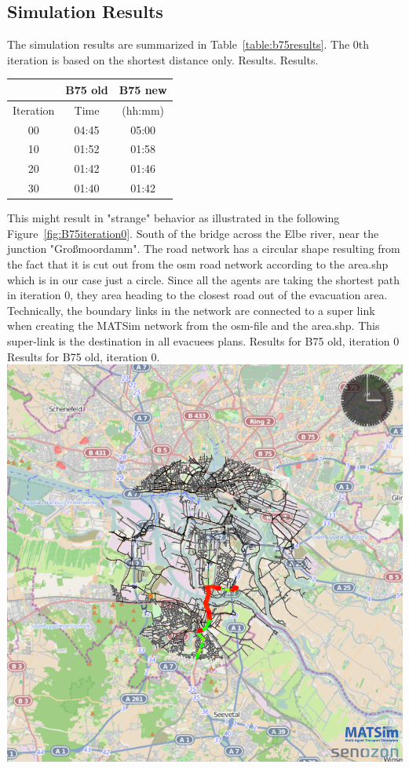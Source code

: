 \subsection{Simulation Results}
The simulation results are summarized in Table~\ref{table:b75results}. The 0th iteration is based on the shortest distance only. 
%
\createtable%
{Results.}%
{Results.}%
{\label{table:b75results}}%
{%
\begin{tabular}{|c|c|c|}
	\hline \rule[-2ex]{0pt}{5.5ex}  & B75 old & B75 new \\ 
	\hline \rule[-2ex]{0pt}{5.5ex}  Iteration & Time &  (hh:mm) \\ 
	\hline \rule[-2ex]{0pt}{5.5ex}  00 & 04:45 &  05:00\\ 
	\hline \rule[-2ex]{0pt}{5.5ex}  10 & 01:52 &  01:58\\ 
	\hline \rule[-2ex]{0pt}{5.5ex}  20 & 01:42 &  01:46\\ 
	\hline \rule[-2ex]{0pt}{5.5ex}  30 & 01:40 &  01:42\\ 
	\hline 
\end{tabular}
}%
{}%
%
This might result in "strange" behavior as illustrated in the following Figure~\ref{fig:B75iteration0}.
South of the bridge across the Elbe river, near the junction "Gro{\ss}moordamm". The road network has a circular shape resulting from the fact that it is cut out from the osm road network according to the area.shp which is in our case just a circle. Since all the agents are taking the shortest path in iteration 0, they area heading to the closest road out of the evacuation area. Technically, the boundary links in the network are connected to a super link when creating the MATSim network from the osm-file and the area.shp. This super-link is the destination in all evacuees plans. 
%
\createfigure%
{Results for B75 old, iteration 0}%
{Results for B75 old, iteration 0.}%
{\label{fig:B75iteration0}}%
{\includegraphics[width=0.7\linewidth]{using/figures/B75iteration0}}%
